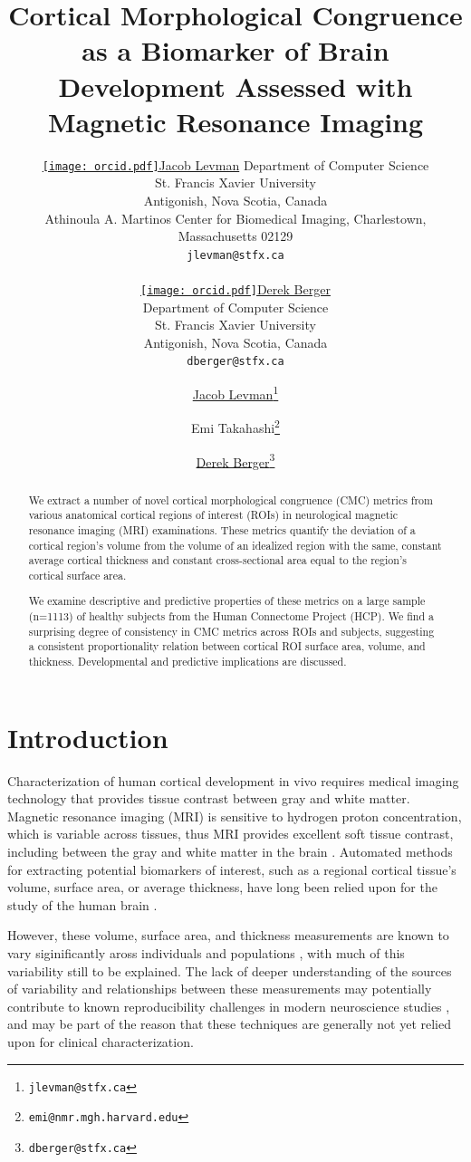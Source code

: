 \documentclass{article}
\title{Cortical Morphological Congruence as a Biomarker of Brain Development Assessed with Magnetic Resonance Imaging}
\author{%
	\href{https://orcid.org/0000-0002-9604-3157}{\texttt{[image: orcid.pdf]}\hspace{1mm}Jacob Levman}
	Department of Computer Science\\
	St. Francis Xavier University\\
	Antigonish, Nova Scotia, Canada\\
	Athinoula A. Martinos Center for Biomedical Imaging, Charlestown, Massachusetts 02129\\
	\texttt{jlevman@stfx.ca} \\

	\And

	\href{https://orcid.org/0000-0003-4733-0624}{\texttt{[image: orcid.pdf]}\hspace{1mm}Derek Berger} \\
	Department of Computer Science\\
	St. Francis Xavier University\\
	Antigonish, Nova Scotia, Canada\\
	\texttt{dberger@stfx.ca} \\
}
\author[1,2,3,4]{%
	\href{https://orcid.org/0000-0002-9604-3157}{\usebox{\orcid}\hspace{1mm}Jacob Levman\thanks{\texttt{jlevman@stfx.ca}}}%
}
\author[1,4]{%
	Emi Takahashi\thanks{\texttt{emi@nmr.mgh.harvard.edu}}%
}
\author[1]{%
	\href{https://orcid.org/0000-0003-4733-0624}{\usebox{\orcid}\hspace{1mm}Derek Berger\thanks{\texttt{dberger@stfx.ca}}}%
}
\affil[1]{Athinoula A. Martinos Center for Biomedical Imaging, Charlestown, Massachusetts 02129}
\affil[2]{Department of Computer Science, St. Francis Xavier University,Antigonish, Nova Scotia}
\affil[3]{Nova Scotia Health Authority, Halifax, NS, Canada}
\affil[4]{Harvard Medical School, Department of Radiology, Boston, MA, USA.}
\begin{document}
\maketitle

\begin{abstract}
We extract a number of novel cortical morphological congruence (CMC) metrics
from various anatomical cortical regions of interest (ROIs) in neurological
magnetic resonance imaging (MRI) examinations. These metrics quantify the
deviation of a cortical region's volume from the volume of an idealized
region with the same, constant average cortical thickness and constant
cross-sectional area equal to the region's cortical surface area.

We examine descriptive and predictive properties of these metrics on a large
sample (n=1113) of healthy subjects from the Human Connectome Project (HCP).
We find a surprising degree of consistency in CMC metrics across ROIs and
subjects, suggesting a consistent proportionality relation between cortical
ROI surface area, volume, and thickness. Developmental and predictive
implications are discussed.
\end{abstract}




\section{Introduction} \label{intro}

Characterization of human cortical development in vivo requires medical
imaging technology that provides tissue contrast between gray and white
matter. Magnetic resonance imaging (MRI) is sensitive to hydrogen proton
concentration, which is variable across tissues, thus MRI provides excellent
soft tissue contrast, including between the gray and white matter in the
brain \citep{duboisMRINeonatalBrain2021}. Automated methods for extracting
potential biomarkers of interest, such as a regional cortical tissue's
volume, surface area, or average thickness, have long been relied upon for
the study of the human brain
\citep{fischlFreeSurfer2012,levmanPediatricStructuralMRI2017,levmanStructuralMagneticResonance2019a,mccannStructuralMagneticResonance2021}.

However, these volume, surface area, and thickness measurements are known to
vary siginificantly aross individuals and populations
\citep{fischlFreeSurfer2012,levmanPediatricStructuralMRI2017,levmanStructuralMagneticResonance2019a},
with much of this variability still to be explained. The lack of deeper
understanding of the sources of variability and relationships between these
measurements may potentially contribute to known reproducibility challenges
in modern neuroscience studies
\citep{martinezReproducibilityBraincognitionRelationships2015,marekReproducibleBrainwideAssociation2022},
and may be part of the reason that these techniques are generally not yet
relied upon for clinical characterization.
\end{document}
